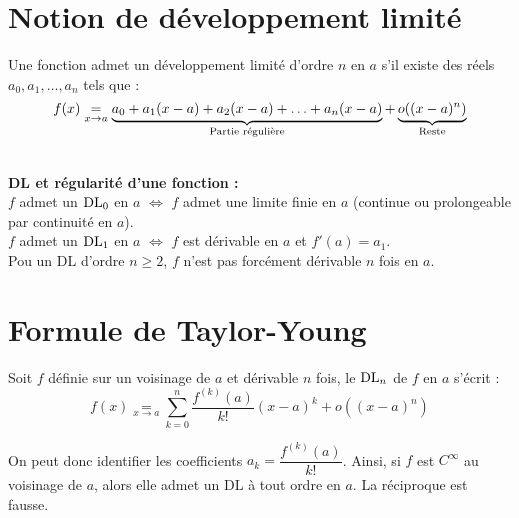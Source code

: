 \section{Notion de développement limité}

    Une fonction admet un développement limité d'ordre $n$ en $a$ s'il existe des réels $a_0, a_1, \ldots, a_n$ tels que :\\
    \[f(x) \underset{x \rightarrow a}{=} \underbrace{a_0 + a_1 (x - a) + a_2 (x - a) + \ldots + a_n (x - a)}_\textrm{Partie régulière} + \underbrace{o((x - a)^n)}_\textrm{Reste}\]

    \vspace{7pt}\\
    \textbf{DL et régularité d'une fonction :}\\
    $f$ admet un $\textrm{DL}_0$ en $a$ $\iff$ $f$ admet une limite finie en $a$ (continue ou prolongeable par continuité en $a$).\\
    $f$ admet un $\textrm{DL}_1$ en $a$ $\iff$ $f$ est dérivable en $a$ et $f'(a) = a_1$.\\
    Pou un DL d'ordre $n \ge 2$, $f$ n'est pas forcément dérivable $n$ fois en $a$.\\


\section{Formule de Taylor-Young}

    Soit $f$ définie sur un voisinage de $a$ et dérivable $n$ fois, le $\textrm{DL}_n$ de $f$ en $a$ s'écrit :\\
    \[f(x) \underset{x \rightarrow a}{=} \sum_{k=0}^n \frac{f^{(k)}(a)}{k!} (x - a)^k + o((x - a)^n)\]

    On peut donc identifier les coefficients $a_k = \dfrac{f^{(k)}(a)}{k!}$. Ainsi, si $f$ est $C^\infty$ au voisinage de $a$, alors elle admet un DL à tout ordre en $a$. La réciproque est fausse.\\

